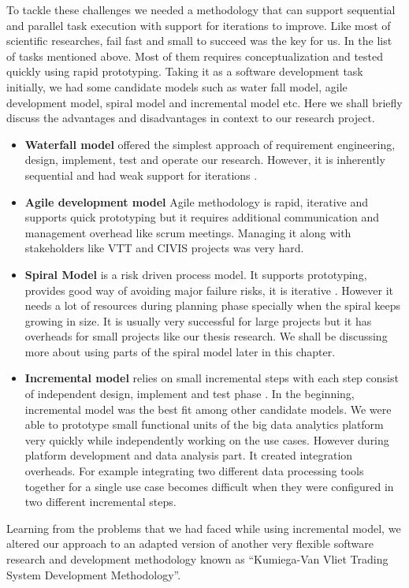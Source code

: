 To tackle these challenges we needed a methodology that can support sequential and parallel task execution with support for iterations to improve. Like most of scientific researches, fail fast and small to succeed was the key for us. In the list of tasks mentioned above. Most of them requires conceptualization and tested quickly using rapid prototyping. Taking it as a software development task initially, we had some candidate models such as water fall model, agile development model, spiral model and incremental model etc. Here we shall briefly discuss the advantages and disadvantages in context to our research project. 
\begin{itemize}
\item \textbf{Waterfall model} offered the simplest approach of requirement engineering, design, implement, test and operate our research. However, it is inherently sequential and had weak support for iterations \cite{Laplante}.
\item \textbf{Agile development model} Agile methodology \cite{martin2003agile} is rapid, iterative and supports quick prototyping but it requires additional communication and management overhead like scrum meetings. Managing it along with stakeholders like VTT and CIVIS projects was very hard.
\item \textbf{Spiral Model} is a risk driven process model. It supports prototyping, provides good way of avoiding major failure risks, it is iterative \cite{Boehm}. However it needs a lot of resources during planning phase specially when the spiral keeps growing in size. It is usually very successful for large projects but it has overheads for small projects like our thesis research. We shall be discussing more about using parts of the spiral model later in this chapter.
\item \textbf{Incremental model} relies on small incremental steps with each step consist of independent design, implement and test phase \cite{jacobson1999unified}. In the beginning, incremental model was the best fit among other candidate models. We were able to prototype small functional units of the big data analytics platform very quickly while independently working on the use cases. However during platform development and data analysis part. It created integration overheads. For example integrating two different data processing tools together for a single use case becomes difficult  when they were configured in two different incremental steps.  
\end{itemize}
Learning from the problems that we had faced while using incremental model, we altered our approach to an adapted version of another very flexible software research and development methodology known as ``Kumiega-Van Vliet Trading System Development Methodology''\cite{kumiega2008software}.

